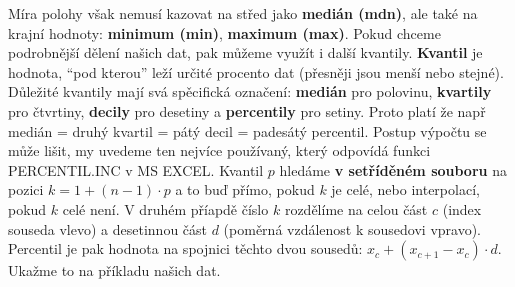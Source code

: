 \documentclass[
  czech,
  11pt,
  letterpaper,
  DIV=11,
  numbers=noendperiod]{scrreprt}
\begin{document}
Míra polohy však nemusí kazovat na střed jako \textbf{medián (mdn)}, ale
také na krajní hodnoty: \textbf{minimum (min)}, \textbf{maximum (max)}.
Pokud chceme podrobnější dělení našich dat, pak můžeme využít i další
kvantily. \textbf{Kvantil} je hodnota, ``pod kterou'' leží určité
procento dat (přesněji jsou menší nebo stejné). Důležité kvantily mají
svá spěcifická označení: \textbf{medián} pro polovinu, \textbf{kvartily}
pro čtvrtiny, \textbf{decily} pro desetiny a \textbf{percentily} pro
setiny. Proto platí že např medián = druhý kvartil = pátý decil =
padesátý percentil. Postup výpočtu se může lišit, my uvedeme ten nejvíce
používaný, který odpovídá funkci PERCENTIL.INC v MS EXCEL. Kvantil \(p\)
hledáme \textbf{v setříděném souboru} na pozici
\textbf{\(k=1+(n-1)\cdot p\)} a to buď přímo, pokud \(k\) je celé, nebo
interpolací, pokud \(k\) celé není. V druhém příapdě číslo \(k\)
rozdělíme na celou část \(c\) (index souseda vlevo) a desetinnou část
\(d\) (poměrná vzdálenost k sousedovi vpravo). Percentil je pak hodnota
na spojnici těchto dvou sousedů:
\textbf{\(x_{c} + (x_{c+1}-x_c) \cdot d\)}. Ukažme to na příkladu našich
dat.
\end{document}

